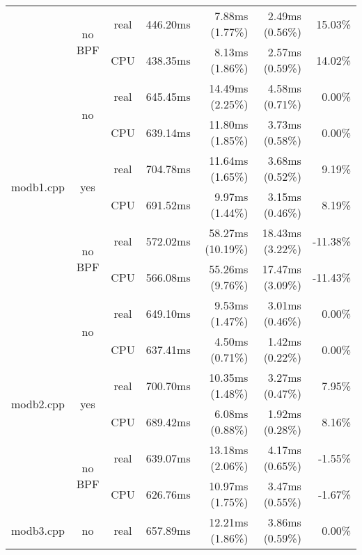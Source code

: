 \documentclass[en]{pracamgr}
\begin{document}
\begin{appendices}
\begin{small}
\begin{longtable}{|l|c|c|r|r|r|r|}
                            \cline{2-7}
                            & \multirow{2}{*}{no BPF} & real & 446.20ms & 7.88ms (1.77\%) & 2.49ms (0.56\%) & 15.03\% \\*
                            &                         & CPU  & 438.35ms & 8.13ms (1.86\%) & 2.57ms (0.59\%) & 14.02\% \\
\hline
\multirow{6}{*}{modb1.cpp}  & \multirow{2}{*}{no}     & real & 645.45ms & 14.49ms (2.25\%) & 4.58ms (0.71\%) & 0.00\% \\*
                            &                         & CPU  & 639.14ms & 11.80ms (1.85\%) & 3.73ms (0.58\%) & 0.00\% \\*
                            \cline{2-7}
                            & \multirow{2}{*}{yes}    & real & 704.78ms & 11.64ms (1.65\%) & 3.68ms (0.52\%) & 9.19\% \\*
                            &                         & CPU  & 691.52ms & 9.97ms (1.44\%) & 3.15ms (0.46\%) & 8.19\% \\*
                            \cline{2-7}
                            & \multirow{2}{*}{no BPF} & real & 572.02ms & 58.27ms (10.19\%) & 18.43ms (3.22\%) & -11.38\% \\*
                            &                         & CPU  & 566.08ms & 55.26ms (9.76\%) & 17.47ms (3.09\%) & -11.43\% \\
\hline
\multirow{6}{*}{modb2.cpp}  & \multirow{2}{*}{no}     & real & 649.10ms & 9.53ms (1.47\%) & 3.01ms (0.46\%) & 0.00\% \\*
                            &                         & CPU  & 637.41ms & 4.50ms (0.71\%) & 1.42ms (0.22\%) & 0.00\% \\*
                            \cline{2-7}
                            & \multirow{2}{*}{yes}    & real & 700.70ms & 10.35ms (1.48\%) & 3.27ms (0.47\%) & 7.95\% \\*
                            &                         & CPU  & 689.42ms & 6.08ms (0.88\%) & 1.92ms (0.28\%) & 8.16\% \\* \cline{2-7}
                            & \multirow{2}{*}{no BPF} & real & 639.07ms & 13.18ms (2.06\%) & 4.17ms (0.65\%) & -1.55\% \\*
                            &                         & CPU  & 626.76ms & 10.97ms (1.75\%) & 3.47ms (0.55\%) & -1.67\% \\
\hline
\multirow{6}{*}{modb3.cpp}  & \multirow{2}{*}{no}     & real & 657.89ms & 12.21ms (1.86\%) & 3.86ms (0.59\%) & 0.00\% \\*

\end{longtable}
\end{small}
\end{appendices}
\end{document}
